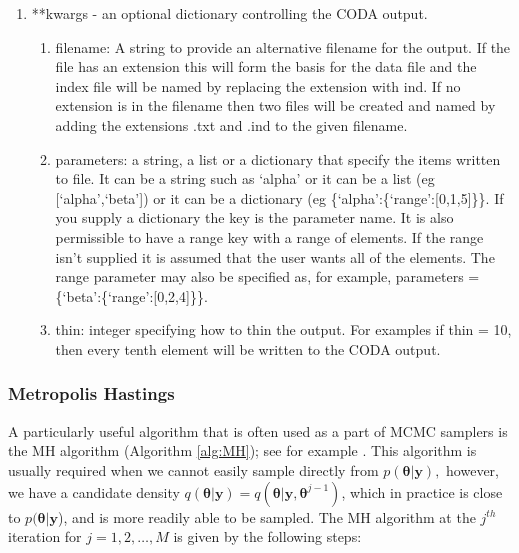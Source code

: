 \documentclass[article]{jss}
\begin{document}
\begin{enumerate}
\begin{enumerate}
\item {*}{*}kwargs - an optional dictionary controlling the CODA
  output.

\begin{enumerate}
\item filename: A string to provide an alternative filename for the
  output.  If the file has an extension this will form the basis for
  the data file and the index file will be named by replacing the
  extension with ind. If no extension is in the filename then two
  files will be created and named by adding the extensions .txt and
  .ind to the given filename.
\item parameters: a string, a list or a dictionary that specify the
  items written to file. It can be a string such as `alpha' or it can
  be a list (eg {[}`alpha',`beta'{]}) or it can be a dictionary (eg
  \{`alpha':\{`range':{[}0,1,5{]}\}\}.  If you supply a dictionary the
  key is the parameter name. It is also permissible to have a range
  key with a range of elements. If the range isn't supplied it is
  assumed that the user wants all of the elements.  The range
  parameter may also be specified as, for example, parameters =
  \{`beta':\{`range':{[}0,2,4{]}\}\}.
\item thin: integer specifying how to thin the output. For examples if
  thin = 10, then every tenth element will be written to the CODA
  output.
\end{enumerate}
\end{enumerate}
\end{enumerate}

\subsubsection{Metropolis Hastings}
\label{sub:Metropolis-Hastings}

A particularly useful algorithm that is often used as a part of MCMC
samplers is the MH algorithm (Algorithm \ref{alg:MH}); see for example
\citet{RobertCassela1999}. This algorithm is usually required when we
cannot easily sample directly from $p(\bm{\theta}|\bm{y}),$ however,
we have a candidate density
$q(\bm{\theta}|\bm{y})=q(\bm{\theta}|\bm{y},\bm{\theta}^{j-1})$, which
in practice is close to $p(\bm{\theta}|\bm{y}$), and is more readily
able to be sampled. The MH algorithm at the $j^{th}$ iteration for
$j=1,2,\dots,M$ is given by the following steps:
\end{document}
